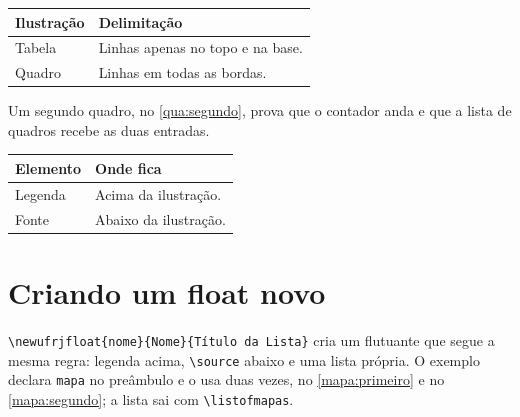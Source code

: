 \documentclass[dsc,setavermelha,numeracaoporcapitulo,linhanafolhaderosto]{ufrj}
\theoremstyle{plain}
\theoremstyle{definition}
\theoremstyle{remark}
\begin{document}
\begin{framefloat}[ht]
\centering
\caption{Exemplo de Quadro}
\label{qua:exemplo}
\begin{tabular}{|l|l|}
\hline
\textbf{Ilustração} & \textbf{Delimitação} \\
\hline
Tabela & Linhas apenas no topo e na base. \\
\hline
Quadro & Linhas em todas as bordas. \\
\hline
\end{tabular}
\end{framefloat}

Um segundo quadro, no \autoref{qua:segundo}, prova que o contador anda e que a lista de quadros recebe as duas entradas.

\begin{framefloat}[ht]
\centering
\caption{Segundo Quadro, para provar a numeração}
\label{qua:segundo}
\begin{tabular}{|l|l|}
\hline
\textbf{Elemento} & \textbf{Onde fica} \\
\hline
Legenda & Acima da ilustração. \\
\hline
Fonte & Abaixo da ilustração. \\
\hline
\end{tabular}
\end{framefloat}

\section{Criando um float novo}

\verb|\newufrjfloat{nome}{Nome}{Título da Lista}| cria um flutuante que segue a mesma regra: legenda acima, \verb|\source| abaixo e uma lista própria. O exemplo declara \verb|mapa| no preâmbulo e o usa duas vezes, no \autoref{mapa:primeiro} e no \autoref{mapa:segundo}; a lista sai com \verb|\listofmapas|.

\begin{mapa}[ht]
\centering
\caption{Primeiro mapa, num float criado pelo autor}
\label{mapa:primeiro}
\end{mapa}
\end{document}
